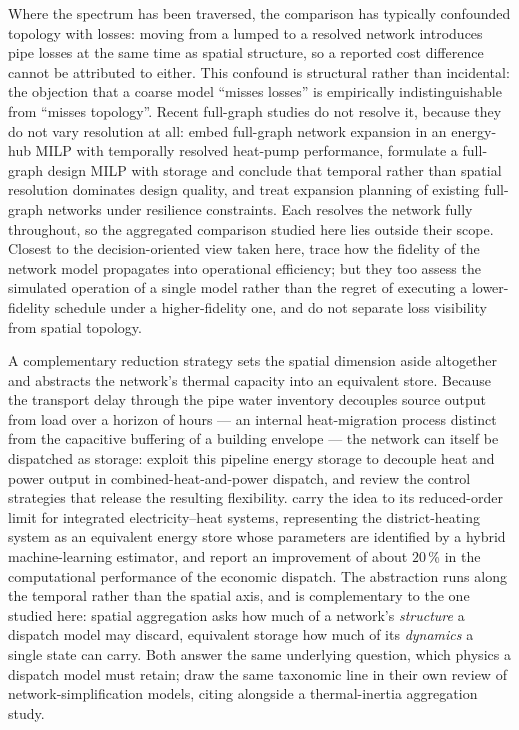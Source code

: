 \documentclass[a4paper,fleqn]{cas-sc}
\providecommand{\DIFadd}[1]{{\protect\color[HTML]{1A5FB4} #1}} %
\providecommand{\DIFaddbegin}{} %
\newcommand{\DIFaddincludegraphics}[2][]{{\color{blue}\fbox{\DIFOincludegraphics[#1]{#2}}}} %
\DeclareRobustCommand{\DIFaddbegin}{\DIFOaddbegin \let\includegraphics\DIFaddincludegraphics} %
\begin{document}
Where the spectrum has been traversed, the comparison has typically confounded topology
with losses: moving from a lumped to a resolved network introduces pipe losses at the same
time as spatial structure, so a reported cost difference cannot be attributed to either.
This confound is structural rather than incidental: the objection that a coarse model
``misses losses'' is empirically indistinguishable from ``misses topology''. Recent full-graph studies do not resolve it,
because they do not vary resolution at all: \citet{Trentmann2026} embed full-graph
network expansion in an energy-hub MILP with temporally resolved heat-pump performance,
\citet{Ceruti2025} formulate a full-graph design MILP with storage and conclude that
temporal rather than spatial resolution dominates design quality, and
\citet{Vieth2026} treat expansion planning of existing full-graph networks under
resilience constraints. Each resolves the network fully throughout, so the aggregated
comparison studied here lies outside their scope. Closest to the decision-oriented view
taken here, \citet{Friedrich2025} trace how the fidelity of the network model propagates
into operational efficiency; but they too assess the simulated operation of a single model
rather than the regret of executing a lower-fidelity schedule under a higher-fidelity one,
and do not separate loss visibility from spatial topology.

\DIFaddbegin \DIFadd{A complementary reduction strategy sets the spatial dimension aside altogether and abstracts
the network's thermal capacity into an equivalent store. Because the transport delay through
the pipe water inventory decouples source output from load over a horizon of hours --- an
internal heat-migration process distinct from the capacitive buffering of a building
envelope --- the network can itself be dispatched as
storage: }\citet{Li2016_pipeline} \DIFadd{exploit this pipeline energy storage to decouple heat and
power output in combined-heat-and-power dispatch, and }\citet{Vandermeulen2018} \DIFadd{review the
control strategies that release the resulting flexibility. }\citet{Yang2024_equivalent} \DIFadd{carry
the idea to its reduced-order limit for integrated electricity--heat systems, representing
the district-heating system as an equivalent energy store whose parameters are identified by
a hybrid machine-learning estimator, and report an improvement of about $20$\,\% in the
computational performance of the economic dispatch. The abstraction runs along the temporal
rather than the spatial axis, and is complementary to the one studied here: spatial
aggregation asks how much of a network's \emph{structure} a dispatch model may discard,
equivalent storage how much of its \emph{dynamics} a single state can carry. Both answer the
same underlying question, which physics a dispatch model must retain; }\citet{Yang2024_equivalent}
\DIFadd{draw the same taxonomic line in their own review of network-simplification models, citing
}\citet{Falay2020} \DIFadd{alongside a thermal-inertia aggregation study.
}
\end{document}
